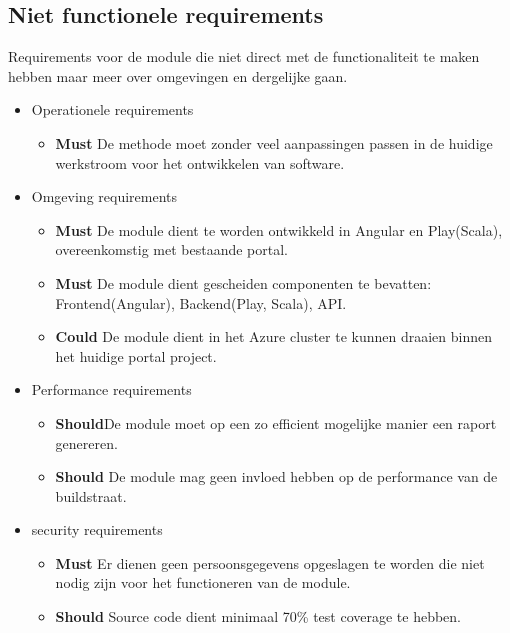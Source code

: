 \subsection{Niet functionele requirements}\label{subsec:niet-functionele-requirements}
Requirements voor de module die niet direct met de functionaliteit te maken hebben maar meer over omgevingen en dergelijke gaan.
\begin{itemize}
    \item Operationele requirements
    \begin{itemize}
        \item \textbf{Must} De methode moet zonder veel aanpassingen passen in de huidige werkstroom voor het ontwikkelen van software.
    \end{itemize}
    \item Omgeving requirements
    \begin{itemize}
        \item \textbf{Must} De module dient te worden ontwikkeld in Angular en Play(Scala), overeenkomstig met bestaande portal.
        \item \textbf{Must} De module dient gescheiden componenten te bevatten: Frontend(Angular), Backend(Play, Scala), API\@.
        \item \textbf{Could} De module dient in het Azure cluster te kunnen draaien binnen het huidige portal project.
    \end{itemize}
    \item Performance requirements
    \begin{itemize}
        \item \textbf{Should}De module moet op een zo efficient mogelijke manier een raport genereren.
        \item \textbf{Should} De module mag geen invloed hebben op de performance van de buildstraat.
    \end{itemize}
    \item security requirements
    \begin{itemize}
        \item \textbf{Must} Er dienen geen persoonsgegevens opgeslagen te worden die niet nodig zijn voor het functioneren van de module.
        \item \textbf{Should} Source code dient minimaal 70\% test coverage te hebben.
    \end{itemize}
\end{itemize}

